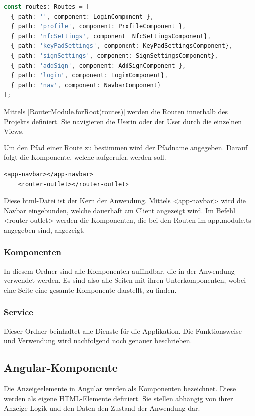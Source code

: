 \begin{lstlisting}[language=typescript, caption=Routing der Komponenten in der app.module.ts]
const routes: Routes = [
  { path: '', component: LoginComponent },
  { path: 'profile', component: ProfileComponent },
  { path: 'nfcSettings', component: NfcSettingsComponent},
  { path: 'keyPadSettings', component: KeyPadSettingsComponent},
  { path: 'signSettings', component: SignSettingsComponent},
  { path: 'addSign', component: AddSignComponent },
  { path: 'login', component: LoginComponent},
  { path: 'nav', component: NavbarComponent}
];
\end{lstlisting}

Mittels [RouterModule.forRoot(routes)] werden die Routen innerhalb des Projekts definiert. Sie navigieren die Userin oder der User durch die einzelnen Views.

Um den Pfad einer Route zu bestimmen wird der Pfadname angegeben.  Darauf folgt die Komponente, welche aufgerufen werden soll. 

\begin{lstlisting}[caption=app.component.html]
    <app-navbar></app-navbar>
    <router-outlet></router-outlet>    
\end{lstlisting}

Diese html-Datei ist der Kern der Anwendung. Mittels <app-navbar> wird die Navbar eingebunden, welche dauerhaft am Client angezeigt wird. Im Befehl <router-outlet> werden die Komponenten, die bei den Routen im app.module.ts angegeben sind, angezeigt.

\subsubsection{Komponenten}
In diesem Ordner sind alle Komponenten auffindbar, die in der Anwendung verwendet werden. Es sind also alle Seiten mit ihren Unterkomponenten, wobei eine Seite eine gesamte Komponente darstellt, zu finden.

\subsubsection{Service}
Dieser Ordner beinhaltet alle Dienste für die Applikation. Die Funktionsweise und Verwendung wird nachfolgend noch genauer beschrieben.

\subsection{Angular-Komponente}
Die Anzeigeelemente in Angular werden als Komponenten bezeichnet. Diese werden als eigene HTML-Elemente definiert. Sie stellen abhängig von ihrer Anzeige-Logik und den Daten den Zustand der Anwendung dar.

